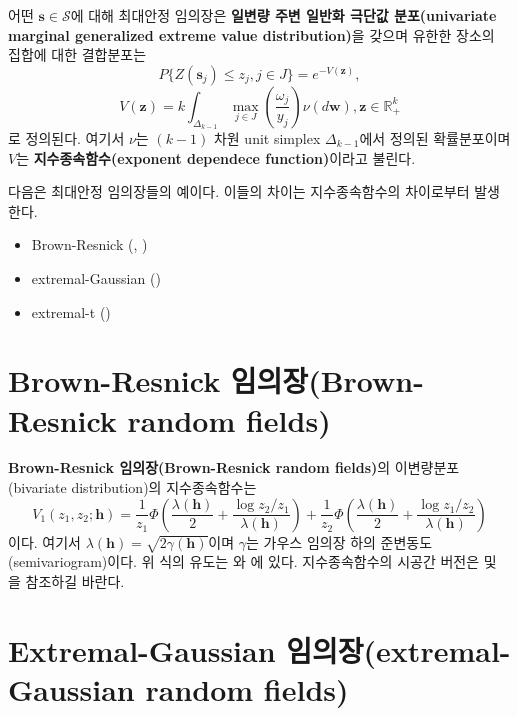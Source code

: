 \documentclass[b5paper,]{scrbook}
\theoremstyle{plain}
\theoremstyle{definition}
\numberwithin{equation}{section}
\begin{document}
어떤 \(\mathbf{s}\in\mathcal{S}\)에 대해 최대안정 임의장은 \textbf{일변량 주변 일반화 극단값 분포(univariate marginal generalized extreme value distribution)}을 갖으며 유한한 장소의 집합에 대한 결합분포는
\[P\{Z(\mathbf{s}_{j})\leq z_{j}, j \in J\}=e^{-V(\mathbf{z})},\]
\[V(\mathbf{z})=k\int_{\Delta_{k-1}}\max_{j\in J}(\frac{\omega_{j}}{y_{j}})\nu(d\mathbf{w}), \mathbf{z}\in\mathbb{R}_{+}^{k}\]
로 정의된다. 여기서 \(\nu\)는 \((k-1)\) 차원 unit simplex \(\Delta_{k-1}\)에서 정의된 확률분포이며 \(V\)는 \textbf{지수종속함수(exponent dependece function)}이라고 불린다.

다음은 최대안정 임의장들의 예이다. 이들의 차이는 지수종속함수의 차이로부터 발생한다.

\begin{itemize}
\item
  Brown-Resnick (\citep{Kabluchko2009a}, \citep{Kabluchko2011})
\item
  extremal-Gaussian (\citep{Schlather2002})
\item
  extremal-t (\citep{Davison2012})
\end{itemize}

\hypertarget{brown-resnick-brown-resnick-random-fields}{%
\section{Brown-Resnick 임의장(Brown-Resnick random fields)}\label{brown-resnick-brown-resnick-random-fields}}

\textbf{Brown-Resnick 임의장(Brown-Resnick random fields)}의 이변량분포(bivariate distribution)의 지수종속함수는
\[
V_{1}(z_{1},z_{2};\mathbf{h})=\frac{1}{z_{1}}\Phi (\frac{\lambda(\mathbf{h})}{2}+\frac{\log z_{2}/z_{1}}{\lambda(\mathbf{h})}) + \frac{1}{z_{2}}\Phi (\frac{\lambda(\mathbf{h})}{2}+\frac{\log z_{1}/z_{2}}{\lambda(\mathbf{h})})
\]
이다. 여기서 \(\lambda(\mathbf{h})=\sqrt{2\gamma(\mathbf{h})}\)이며 \(\gamma\)는 가우스 임의장 하의 준변동도(semivariogram)이다. 위 식의 유도는 \citep{Husler1989}와 \citep{Smith1990}에 있다. 지수종속함수의 시공간 버전은 \citep{Kabluchko2009b} 및 \citep{Davis2013}을 참조하길 바란다.

\hypertarget{extremal-gaussian-extremal-gaussian-random-fields}{%
\section{Extremal-Gaussian 임의장(extremal-Gaussian random fields)}\label{extremal-gaussian-extremal-gaussian-random-fields}}
\end{document}
